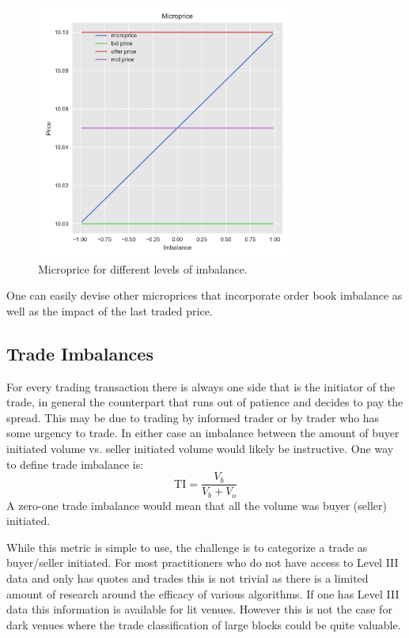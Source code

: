 	\begin{figure}[!ht]
		\centering
			\includegraphics[width=0.75\textwidth]{chapters/chapter_trade_data_models/figures/microprice.png} 
		\caption{Microprice for different levels of imbalance. \label{fig:microprice}}
	\end{figure}

One can easily devise other microprices that incorporate order book imbalance as well as the impact of the last traded price.

\subsection{Trade Imbalances}

For every trading transaction there is always one side that is the initiator of the trade, in general the counterpart that runs out of patience and decides to pay the spread. This may be due to trading by informed trader or by trader who has some urgency to trade. In either case an imbalance between the amount of buyer initiated volume vs. seller initiated volume would likely be instructive. One way to define trade imbalance is: 
	\begin{equation}\label{eq:vbs}
	\text{TI}=\frac{V_b}{V_b+V_o}	
	\end{equation} 
A zero-one trade imbalance would mean that all the volume was buyer (seller) initiated. 


While this metric is simple to use, the challenge is to categorize a trade as buyer/seller initiated. For most practitioners who do not have access to Level III data and only has quotes and trades this is not trivial as there is a limited amount of research around the efficacy of various algorithms. If one has Level III data this information is available for lit venues. However this is not the case for dark venues where the trade classification of large blocks could be quite valuable.


